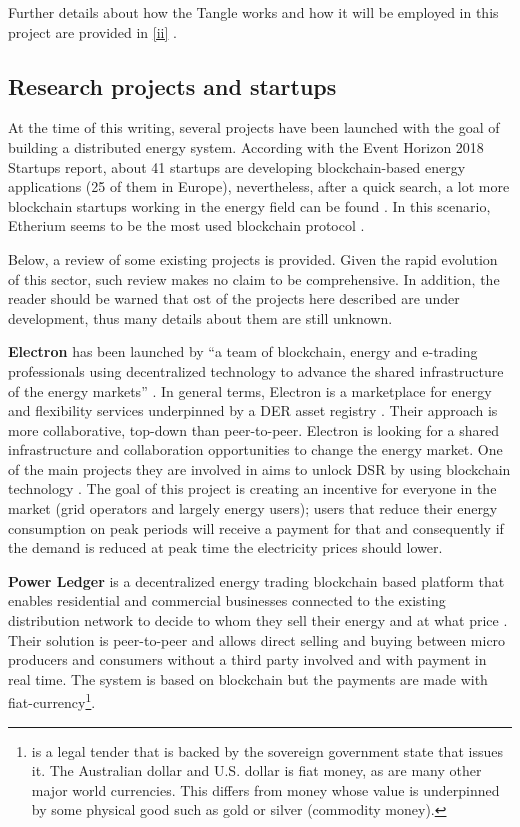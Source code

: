 Further details about how the Tangle works and how it will be employed in this project are provided in \ref{ii} . 


\subsection{Research projects and startups}


At the time of this writing, several projects have been launched with the goal of building a distributed energy system. According with the Event Horizon 2018 Startups report, about 41 startups are developing blockchain-based energy applications (25 of them in Europe), nevertheless, after a quick search, a lot more blockchain startups working in the energy field can be found \cite{EnergyBlockchainStartups}. In this scenario, Etherium seems to be the most used blockchain protocol \cite{STARTUPSWHOISWHO}.



Below, a review of some existing projects is provided. Given the rapid evolution of this sector, such review makes no claim to be comprehensive. In addition, the reader should be warned that ost of the projects here described are under development, thus many details about them are still unknown. 



\textbf{Electron} has been launched by “a team of blockchain, energy and e-trading professionals using decentralized technology to advance the shared infrastructure of the energy markets” \cite{Electron}. In general terms, Electron is a marketplace for energy and flexibility services underpinned by a \ac{DER} asset registry \cite{STARTUPSWHOISWHO}.
Their approach is more collaborative, top-down than peer-to-peer. Electron is looking for a shared infrastructure and collaboration opportunities to change the energy market. One of the main projects they are involved in aims to unlock \ac{DSR} by using blockchain technology \cite{demand-sideresponse}. The goal of this project is creating an incentive for everyone in the market (grid operators and largely energy users); users that reduce their energy consumption on peak periods will receive a payment for that and consequently if the demand is reduced at peak time the electricity prices should lower.



\textbf{Power Ledger} is a decentralized energy trading blockchain based platform that enables residential and commercial businesses connected to the existing distribution network to decide to whom they sell their energy and at what price \cite{STARTUPSWHOISWHO}. Their solution is peer-to-peer and allows direct selling and buying between micro producers and consumers without a third party involved and with payment in real time. The system is based on blockchain but the payments are made with fiat-currency\footnote{is a legal tender that is backed by the sovereign government state that issues it. The
Australian dollar and U.S. dollar is fiat money, as are many other major world currencies. This differs
from money whose value is underpinned by some physical good such as gold or silver (commodity
money).}.



